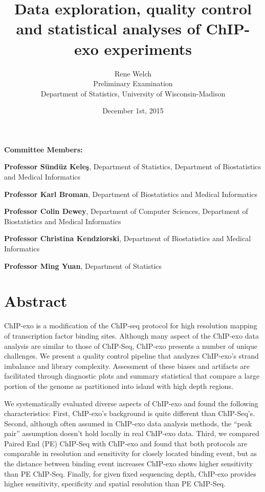 \documentclass[11pt]{article}\usepackage[]{graphicx}\usepackage[]{color}
\title{Data exploration, quality control and statistical analyses of
  ChIP-exo experiments\vspace*{\fill}}
\author{Rene Welch\\Preliminary Examination\\Department of Statistics,
  University of Wisconsin-Madison}
\date{December 1st, 2015}
\begin{document}
\newcommand{\sig}{\sigma^{70}}


\maketitle

\vspace*{\fill}

\textbf{Committee Members:}

\textbf{Professor S\"und\"uz Kele\c{s}}, Department of Statistics,
Department of Biostatistics and Medical Informatics

\textbf{Professor Karl Broman}, Department of Biostatistics and
Medical Informatics

\textbf{Professor Colin Dewey}, Department of Computer Sciences,
Department of Biostatistics and Medical Informatics

\textbf{Professor Christina Kendziorski}, Department of Biostatistics
and Medical Informatics

\textbf{Professor Ming Yuan}, Department of Statistics

\thispagestyle{empty}


\newpage

\tableofcontents

\newpage

\listoffigures

\newpage


\section*{Abstract}

ChIP-exo is a modification of the ChIP-seq protocol for high
resolution mapping of transcription factor binding sites. Although
many aspect of the ChIP-exo data analysis are similar to those of
ChIP-Seq, ChIP-exo presents a number of unique challenges. We present
a quality control pipeline that analyzes ChIP-exo's strand imbalance
and library complexity. Assessment of these biases and artifacts are
facilitated through diagnostic plots and summary statistical that
compare a large portion of the genome as partitioned into island with
high depth regions.

We systematically evaluated diverse aspects of ChIP-exo and found the
following characteristics: First, ChIP-exo's background is quite
different than ChIP-Seq's. Second, although often assumed in ChIP-exo
data analysis methods, the ``peak pair'' assumption doesn't hold
locally in real ChIP-exo data. Third, we compared Paired End (PE)
ChIP-Seq with ChIP-exo and found that both protocols are comparable in
resolution and sensitivity for closely located binding event, but as
the distance between binding event increases ChIP-exo shows higher
sensitivity than PE ChIP-Seq. Finally, for given fixed sequencing
depth, ChIP-exo provides higher sensitivity, specificity and spatial
resolution than PE ChIP-Seq.
\end{document}
